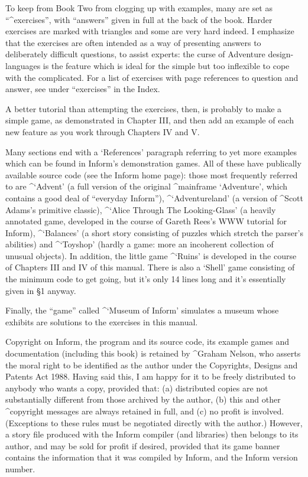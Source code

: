 To keep from Book Two from clogging up with examples, many are set as
``^{exercises}'', with ``answers'' given in full at the back of the book.
Harder exercises are marked with triangles and some are very hard indeed.
I emphasize that the exercises are often intended as a way of presenting answers
to deliberately difficult questions, to assist experts: the curse of Adventure
design-languages is the feature which is ideal for the simple but too inflexible
to cope with the complicated.  For a list of exercises with page references to
question and answer, see under ``exercises'' in the Index.

A better tutorial than attempting the exercises, then, is probably to make
a simple game, as demonstrated in Chapter III, and then add an example of each
new feature as you work through Chapters IV and V.

Many sections end with a `References' paragraph referring to yet
more examples which can be found in Inform's demonstration games.  All of these
have publically available source code (see the Inform home page): those most
frequently referred to are ^{`Advent'} (a full version of the original
^{mainframe `Adventure'}, which contains a good deal of ``everyday Inform''),
^{`Adventureland'} (a version of ^{Scott Adams}'s primitive classic),
^{`Alice Through The Looking-Glass'} (a heavily annotated game, developed in
the course of Gareth Rees's WWW tutorial for Inform), ^{`Balances'} (a short
story consisting of puzzles which stretch the parser's abilities) and
^{`Toyshop'} (hardly a game: more an incoherent collection of unusual
objects).  In addition, the little game ^{`Ruins'} is developed
in the course of Chapters III and IV of this manual.  There is also a `Shell'
game consisting of the minimum code to get going, but it's only 14 lines long
and it's essentially given in \S 1 anyway.

Finally, the ``game'' called ^{`Museum of Inform'} simulates a museum whose
exhibits are solutions to the exercises in this manual.

\bigskip
Copyright on Inform, the program and its source code, its example games
and documentation (including this book) is retained by ^{Graham Nelson}, who
asserts the moral right to be identified as the author under the Copyrights,
Designs and Patents Act 1988.  Having said this, I am happy for it to be freely
distributed to anybody who wants a copy, provided that: (a) distributed copies
are not substantially different from those archived by the author, (b) this and
other ^{copyright} messages are always retained in full, and (c) no profit is
involved.  (Exceptions to these rules must be negotiated directly with the
author.)  However, a story file produced with the Inform compiler (and
libraries) then belongs to its author, and may be sold for profit if desired,
provided that its game banner contains the information that it was compiled by
Inform, and the Inform version number.

